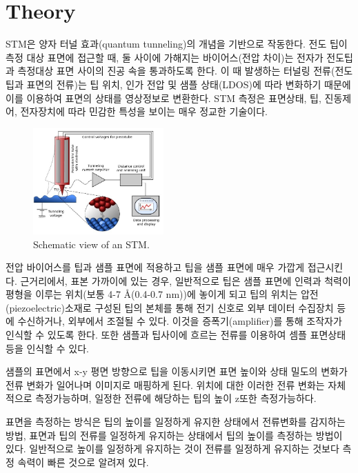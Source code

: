 \documentclass[a4paper, 10pt, nanum]{CSUniSchoolLabReport}
\begin{document}

\section{Theory}

	STM은 양자 터널 효과(quantum tunneling)의 개념을 기반으로 작동한다. 전도 팁이 측정 대상 표면에 접근할 때, 둘 사이에 가해지는 바이어스(전압 차이)는 전자가 전도팁과 측정대상 표면 사이의 진공 속을 통과하도록 한다. 이 때 발생하는 터널링 전류(전도팁과 표면의 전류)는 팁 위치, 인가 전압 및 샘플 상태(LDOS)에 따라 변화하기 때문에 이를 이용하여 표면의 상태를 영상정보로 변환한다. STM 측정은 표면상태, 팁, 진동제어, 전자장치에 따라 민감한 특성을 보이는 매우 정교한 기술이다.

	\begin{figure}[htb!]
		\centering
		\includegraphics[width=5cm]{Figures/STM1.jpg}
		\caption{Schematic view of an STM.}
		\label{fig:STM}
	\end{figure}

  전압 바이어스를 팁과 샘플 표면에 적용하고 팁을 샘플 표면에 매우 가깝게 접근시킨다. 근거리에서, 표본 가까이에 있는 경우, 일반적으로 팁은 샘플 표면에 인력과 척력이 평형을 이루는 위치(보통 4-7 Å(0.4-0.7 nm))에 놓이게 되고 팁의 위치는 압전(piezoelectric)소재로 구성된 팁의 본체를 통해 전기 신호로 외부 데이터 수집장치 등에 수신하거나, 외부에서 조절될 수 있다. 이것을 증폭기(amplifier)를 통해 조작자가 인식할 수 있도록 한다. 또한 샘플과 팁사이에 흐르는 전류를 이용하여 셈플 표면상태 등을 인식할 수 있다.

	샘플의 표면에서 x-y 평면 방향으로 팁을 이동시키면 표면 높이와 상태 밀도의 변화가 전류 변화가 일어나며 이미지로 매핑하게 된다. 위치에 대한 이러한 전류 변화는 자체적으로 측정가능하며, 일정한 전류에 해당하는 팁의 높이 z또한 측정가능하다. 

	표면을 측정하는 방식은 팁의 높이를 일정하게 유지한 상태에서 전류변화를 감지하는 방법, 표면과 팁의 전류를 일정하게 유지하는 상태에서 팁의 높이를 측정하는 방법이 있다. 일반적으로 높이를 일정하게 유지하는 것이 전류를 일정하게 유지하는 것보다 측정 속력이 빠른 것으로 알려져 있다.
\end{document}
